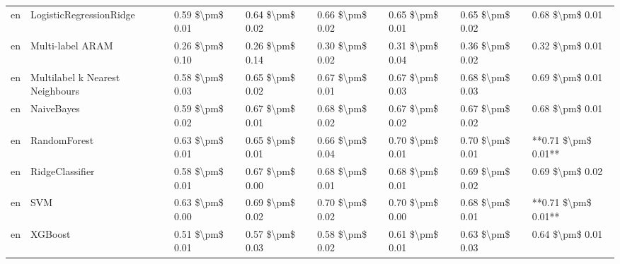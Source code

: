\begin{tabular}{llllllll}
      en &         LogisticRegressionRidge & 0.59 \$\textbackslash pm\$ 0.01 &           0.64 \$\textbackslash pm\$ 0.02 &       0.66 \$\textbackslash pm\$ 0.02 &        0.65 \$\textbackslash pm\$ 0.01 &                         0.65 \$\textbackslash pm\$ 0.02 &     0.68 \$\textbackslash pm\$ 0.01 \\
      en &                Multi-label ARAM & 0.26 \$\textbackslash pm\$ 0.10 &           0.26 \$\textbackslash pm\$ 0.14 &       0.30 \$\textbackslash pm\$ 0.02 &        0.31 \$\textbackslash pm\$ 0.04 &                         0.36 \$\textbackslash pm\$ 0.02 &     0.32 \$\textbackslash pm\$ 0.01 \\
      en & Multilabel k Nearest Neighbours & 0.58 \$\textbackslash pm\$ 0.03 &           0.65 \$\textbackslash pm\$ 0.02 &       0.67 \$\textbackslash pm\$ 0.01 &        0.67 \$\textbackslash pm\$ 0.03 &                         0.68 \$\textbackslash pm\$ 0.03 &     0.69 \$\textbackslash pm\$ 0.01 \\
      en &                      NaiveBayes & 0.59 \$\textbackslash pm\$ 0.02 &           0.67 \$\textbackslash pm\$ 0.01 &       0.68 \$\textbackslash pm\$ 0.02 &        0.67 \$\textbackslash pm\$ 0.02 &                         0.67 \$\textbackslash pm\$ 0.02 &     0.68 \$\textbackslash pm\$ 0.01 \\
      en &                    RandomForest & 0.63 \$\textbackslash pm\$ 0.01 &           0.65 \$\textbackslash pm\$ 0.01 &       0.66 \$\textbackslash pm\$ 0.04 &        0.70 \$\textbackslash pm\$ 0.01 &                         0.70 \$\textbackslash pm\$ 0.01 & **0.71 \$\textbackslash pm\$ 0.01** \\
      en &                 RidgeClassifier & 0.58 \$\textbackslash pm\$ 0.01 &           0.67 \$\textbackslash pm\$ 0.00 &       0.68 \$\textbackslash pm\$ 0.01 &        0.68 \$\textbackslash pm\$ 0.01 &                         0.69 \$\textbackslash pm\$ 0.02 &     0.69 \$\textbackslash pm\$ 0.02 \\
      en &                             SVM & 0.63 \$\textbackslash pm\$ 0.00 &           0.69 \$\textbackslash pm\$ 0.02 &       0.70 \$\textbackslash pm\$ 0.02 &        0.70 \$\textbackslash pm\$ 0.00 &                         0.68 \$\textbackslash pm\$ 0.01 & **0.71 \$\textbackslash pm\$ 0.01** \\
      en &                         XGBoost & 0.51 \$\textbackslash pm\$ 0.01 &           0.57 \$\textbackslash pm\$ 0.03 &       0.58 \$\textbackslash pm\$ 0.02 &        0.61 \$\textbackslash pm\$ 0.01 &                         0.63 \$\textbackslash pm\$ 0.03 &     0.64 \$\textbackslash pm\$ 0.01 \\

\end{tabular}
